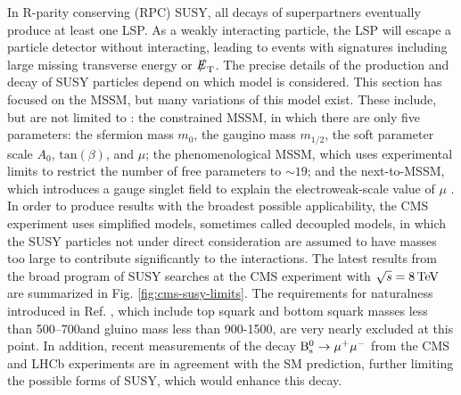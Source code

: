\documentclass[12pt]{thesis}  %
\def\eslash{\ensuremath{{\hbox{$E$\kern-0.6em\lower-.05ex\hbox{/}\kern0.10em}}}}
\def\met{\mbox{$\eslash_\text{T}$}\xspace} %
\begin{document}
In R-parity conserving (RPC) SUSY, all decays of superpartners eventually produce at least one LSP. As a weakly interacting particle, the LSP will escape a particle detector without interacting, leading to events with signatures including large missing transverse energy or \met. The precise details of the production and decay of SUSY particles depend on which model is considered. This section has focused on the MSSM, but many variations of this model exist. These include, but are not limited to \cite{PDG}: the constrained MSSM, in which there are only five parameters: the sfermion mass $m_0$, the gaugino mass $m_{1/2}$, the soft parameter scale $A_{0}$, $\text{tan}(\beta)$, and $\mu$; the phenomenological MSSM, which uses experimental limits to restrict the number of free parameters to ${\sim}19$; and the next-to-MSSM, which introduces a gauge singlet field to explain the electroweak-scale value of $\mu$ \cite{NMSSM}. In order to produce results with the broadest possible applicability, the CMS experiment uses simplified models, sometimes called decoupled models, in which the SUSY particles not under direct consideration are assumed to have masses too large to contribute significantly to the interactions. The latest results from the broad program of SUSY searches at the CMS experiment with $\sqrt{s}=8\,\text{Te\hspace{-.08em}V}$ are summarized in Fig. \ref{fig:cms-susy-limits}. The requirements for naturalness introduced in Ref. \cite{NaturalSUSY}, which include top squark and bottom squark masses less than 500--700\GeV and gluino mass less than 900-1500\GeV, are very nearly excluded at this point. In addition, recent measurements of the decay $\mathrm{B}^{0}_{\mathrm{s}} \rightarrow \mu^{+} \mu^{-}$ from the CMS \cite{CMS-BSmumu} and LHCb \cite{LHCb-BSmumu} experiments are in agreement with the SM prediction, further limiting the possible forms of SUSY, which would enhance this decay.
\end{document}
